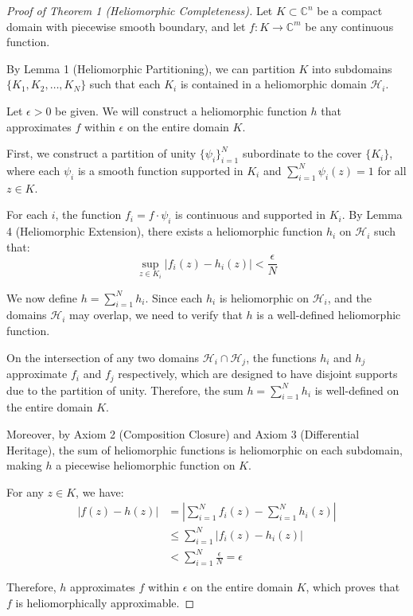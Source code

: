 \begin{proof}[Proof of Theorem 1 (Heliomorphic Completeness)]
Let $K \subset \mathbb{C}^n$ be a compact domain with piecewise smooth boundary, and let $f: K \rightarrow \mathbb{C}^m$ be any continuous function.

By Lemma 1 (Heliomorphic Partitioning), we can partition $K$ into subdomains $\{K_1, K_2, \ldots, K_N\}$ such that each $K_i$ is contained in a heliomorphic domain $\mathcal{H}_i$.

Let $\epsilon > 0$ be given. We will construct a heliomorphic function $h$ that approximates $f$ within $\epsilon$ on the entire domain $K$.

First, we construct a partition of unity $\{\psi_i\}_{i=1}^{N}$ subordinate to the cover $\{K_i\}$, where each $\psi_i$ is a smooth function supported in $K_i$ and $\sum_{i=1}^{N} \psi_i(z) = 1$ for all $z \in K$.

For each $i$, the function $f_i = f \cdot \psi_i$ is continuous and supported in $K_i$. By Lemma 4 (Heliomorphic Extension), there exists a heliomorphic function $h_i$ on $\mathcal{H}_i$ such that:
\begin{equation}
\sup_{z \in K_i} |f_i(z) - h_i(z)| < \frac{\epsilon}{N}
\end{equation}

We now define $h = \sum_{i=1}^{N} h_i$. Since each $h_i$ is heliomorphic on $\mathcal{H}_i$, and the domains $\mathcal{H}_i$ may overlap, we need to verify that $h$ is a well-defined heliomorphic function.

On the intersection of any two domains $\mathcal{H}_i \cap \mathcal{H}_j$, the functions $h_i$ and $h_j$ approximate $f_i$ and $f_j$ respectively, which are designed to have disjoint supports due to the partition of unity. Therefore, the sum $h = \sum_{i=1}^{N} h_i$ is well-defined on the entire domain $K$.

Moreover, by Axiom 2 (Composition Closure) and Axiom 3 (Differential Heritage), the sum of heliomorphic functions is heliomorphic on each subdomain, making $h$ a piecewise heliomorphic function on $K$.

For any $z \in K$, we have:
\begin{align}
|f(z) - h(z)| &= \left|\sum_{i=1}^{N} f_i(z) - \sum_{i=1}^{N} h_i(z)\right|\\
&\leq \sum_{i=1}^{N} |f_i(z) - h_i(z)|\\
&< \sum_{i=1}^{N} \frac{\epsilon}{N} = \epsilon
\end{align}

Therefore, $h$ approximates $f$ within $\epsilon$ on the entire domain $K$, which proves that $f$ is heliomorphically approximable.
\end{proof}

